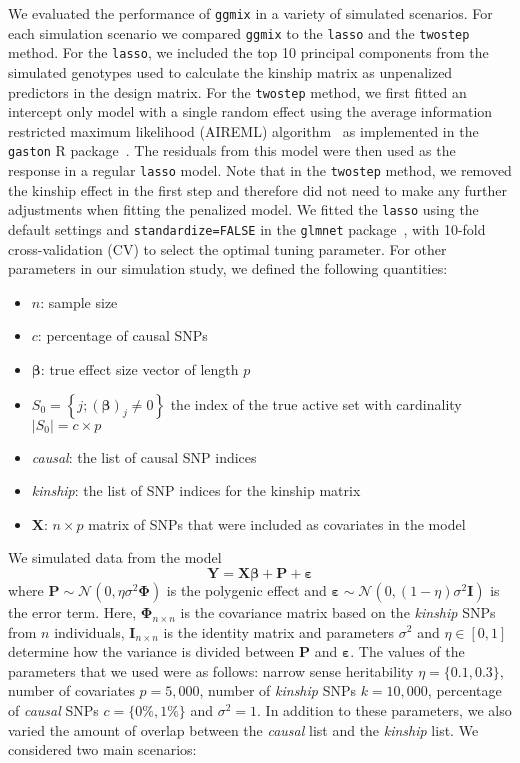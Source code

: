 \documentclass[10pt,letterpaper]{article}
\newcommand{\bX}{\textbf{X}}
\newcommand{\bY}{\textbf{Y}}
\newcommand{\bI}{\textbf{I}}
\newcommand{\be}{\boldsymbol{\varepsilon}}
\newcommand{\bbeta}{\boldsymbol{\beta}}
\newcommand{\bPhi}{\boldsymbol{\Phi}}
\begin{document}
We evaluated the performance of \texttt{ggmix} in a variety of simulated scenarios. For each simulation scenario we compared \texttt{ggmix} to the \texttt{lasso} and the \texttt{twostep} method. For the \texttt{lasso}, we included the top 10 principal components from the simulated genotypes used to calculate the kinship matrix as unpenalized predictors in the design matrix. For the \texttt{twostep} method, we first fitted an intercept only model with a single random effect using the average information restricted maximum likelihood (AIREML) algorithm~\cite{gilmour1995average} as implemented in the \texttt{gaston} R package~\cite{gaston}. The residuals from this model were then used as the response in a regular \texttt{lasso} model. Note that in the \texttt{twostep} method, we removed the kinship effect in the first step and therefore did not need to make any further adjustments when fitting the penalized model. We fitted the \texttt{lasso} using the default settings and \texttt{standardize=FALSE} in the \texttt{glmnet} package~\cite{friedman2010regularization}, with 10-fold cross-validation (CV) to select the optimal tuning parameter. For other parameters in our simulation study, we defined the following quantities:

\begin{itemize}
	\item $n$: sample size
	\item $c$: percentage of causal SNPs
	\item $\bbeta$: true effect size vector of length $p$ 
	\item $S_0 = \left\lbrace j; (\bbeta)_j \neq 0 \right\rbrace$ the index of the true active set with cardinality $ |S_0| = c\times p$
	\item \textit{causal}: the list of causal SNP indices
	\item \textit{kinship}: the list of SNP indices for the kinship matrix
	\item $\bX$: $n \times p$ matrix of SNPs that were included as covariates in the model
\end{itemize}

We simulated data from the model
\begin{equation}
\bY = \bX \bbeta + \mathbf{P} + \be
\end{equation}
where $\mathbf{P}\sim \mathcal{N}(0, \eta \sigma^2 \bPhi)$ is the polygenic effect and $\be \sim \mathcal{N}(0, (1-\eta) \sigma^2 \bI)$ is the error term. Here, $\bPhi_{n \times n}$ is the covariance matrix based on the \textit{kinship} SNPs from $n$ individuals, $\bI_{n \times n}$ is the identity matrix and parameters $\sigma^2$ and $\eta \in [0,1]$ determine how the variance is divided between $\mathbf{P}$ and $\be$. The values of the parameters that we used were as follows: narrow sense heritability $\eta=\lbrace 0.1, 0.3 \rbrace$, number of covariates $p = 5,000$, number of \textit{kinship} SNPs $k = 10,000$, percentage of \textit{causal} SNPs $c=\lbrace 0\%, 1\%\rbrace$ and $\sigma^2 = 1$. In addition to these parameters, we also varied the amount of overlap between the \textit{causal} list and the \textit{kinship} list. We considered two main scenarios:
\end{document}
